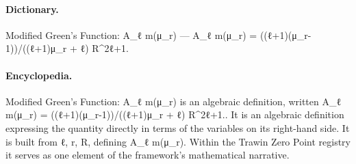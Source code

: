 \paragraph{Dictionary.}
Modified Green’s Function: A\_ℓ m(μ\_r) — A\_ℓ m(μ\_r) = ((ℓ+1)(μ\_r-1))/((ℓ+1)μ\_r + ℓ) R\textasciicircum{}2ℓ+1.

\paragraph{Encyclopedia.}
Modified Green’s Function: A\_ℓ m(μ\_r) is an algebraic definition, written A\_ℓ m(μ\_r) = ((ℓ+1)(μ\_r-1))/((ℓ+1)μ\_r + ℓ) R\textasciicircum{}2ℓ+1.. It is an algebraic definition expressing the quantity directly in terms of the variables on its right-hand side. It is built from ℓ, r, R, defining A\_ℓ m(μ\_r). Within the Trawin Zero Point registry it serves as one element of the framework's mathematical narrative.
